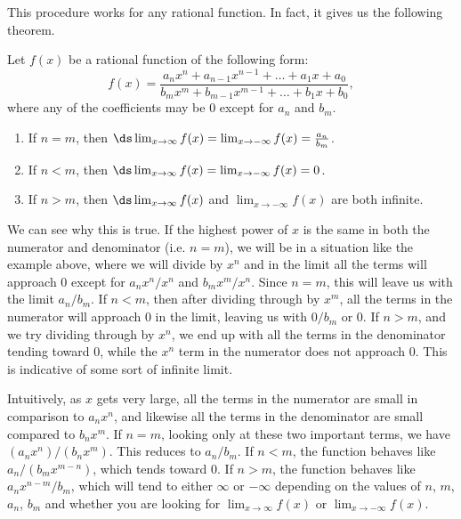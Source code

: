 This procedure works for any rational function.  In fact, it gives us the following theorem.

\addtocounter{figure}{1}
{Let $f(x)$ be a rational function of the following form:
\[
f(x)=\frac{a_nx^n + a_{n-1}x^{n-1}+\dots + a_1x + a_0}{b_mx^m + b_{m-1}x^{m-1} + \dots + b_1x + b_0},
\]
where any of the coefficients may be 0 except for $a_n$ and $b_m$.
\begin{enumerate}
\item If $n=m$, then $\ds\lim_{x\rightarrow\infty} f(x) = \lim_{x\rightarrow-\infty} f(x) = \frac{a_n}{b_m}$.
\item If $n<m$, then $\ds\lim_{x\rightarrow\infty} f(x) = \lim_{x\rightarrow-\infty} f(x) = 0$.
\item If $n>m$, then $\ds\lim_{x\rightarrow\infty} f(x)$ and $\lim_{x\rightarrow-\infty} f(x)$ are both infinite.
\end{enumerate}
}

We can see why this is true.  If the highest power of $x$ is the same in both the numerator and denominator (i.e. $n=m$), we will be in a situation like the example above, where we will divide by $x^n$ and in the limit all the terms will approach 0 except for $a_nx^n/x^n$ and $b_mx^m/x^n$. Since $n=m$, this will leave us with the limit $a_n/b_m$.  If $n<m$, then after dividing through by $x^m$, all the terms in the numerator will approach 0 in the limit, leaving us with $0/b_m$ or 0.  If $n>m$, and we try dividing through by $x^n$, we end up with all the terms in the denominator tending toward 0, while the $x^n$ term in the numerator does not approach 0.  This is indicative of some sort of infinite limit.

Intuitively, as $x$ gets very large, all the terms in the numerator are small in comparison to $a_nx^n$, and likewise all the terms in the denominator are small compared to $b_nx^m$.  If $n=m$, looking only at these two important terms, we have $(a_nx^n)/(b_nx^m)$.  This reduces to $a_n/b_m$.  If $n<m$, the function behaves like $a_n/(b_mx^{m-n})$, which tends toward 0.  If $n>m$, the function behaves like $a_nx^{n-m}/b_m$, which will tend to either $\infty$ or $-\infty$ depending on the values of $n$, $m$, $a_n$, $b_m$ and whether you are looking for $\lim_{x\rightarrow\infty} f(x)$ or $\lim_{x\rightarrow-\infty} f(x)$.

